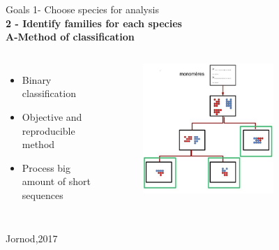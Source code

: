 \documentclass[11pt]{beamer}
\begin{document}
\begin{frame}{Goals}
	1- Choose species for analysis \\ \medbreak
	\textbf{2 - Identify families for each species }\\ \medbreak
		\textbf{A-Method of classification}
		\begin{columns}	
		\begin{itemize}
			\item Binary classification
			\item Objective and reproducible method
			\item Process big amount of short sequences
		\end{itemize}
		\begin{figure}
			\includegraphics[width=0.7\textwidth]{img/algo_florence.png}
		\end{figure}	
		\end{columns}
		\begin{flushright}
			{\tiny Jornod,2017}
		\end{flushright} 
\end{frame}
\end{document}
